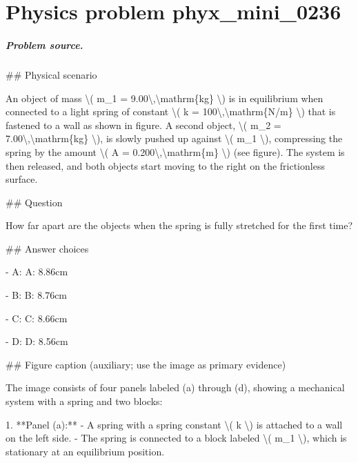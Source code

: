 
\chapter{Physics problem phyx\_mini\_0236}
\label{ch:PhyXMiniProblems_problem_phyx_mini_0236}

\paragraph{Problem source.}
\#\# Physical scenario

An object of mass \textbackslash{}( m\_1 = 9.00\textbackslash{},\textbackslash{}mathrm\{kg\} \textbackslash{}) is in equilibrium when connected to a light spring of constant \textbackslash{}( k = 100\textbackslash{},\textbackslash{}mathrm\{N/m\} \textbackslash{}) that is fastened to a wall as shown in figure. A second object, \textbackslash{}( m\_2 = 7.00\textbackslash{},\textbackslash{}mathrm\{kg\} \textbackslash{}), is slowly pushed up against \textbackslash{}( m\_1 \textbackslash{}), compressing the spring by the amount \textbackslash{}( A = 0.200\textbackslash{},\textbackslash{}mathrm\{m\} \textbackslash{}) (see figure). The system is then released, and both objects start moving to the right on the frictionless surface.

\#\# Question

How far apart are the objects when the spring is fully stretched for the first time?

\#\# Answer choices

- A: A: 8.86cm

- B: B: 8.76cm

- C: C: 8.66cm

- D: D: 8.56cm

\#\# Figure caption (auxiliary; use the image as primary evidence)

The image consists of four panels labeled (a) through (d), showing a mechanical system with a spring and two blocks:

1. **Panel (a):**
   - A spring with a spring constant \textbackslash{}( k \textbackslash{}) is attached to a wall on the left side.
   - The spring is connected to a block labeled \textbackslash{}( m\_1 \textbackslash{}), which is stationary at an equilibrium position.

